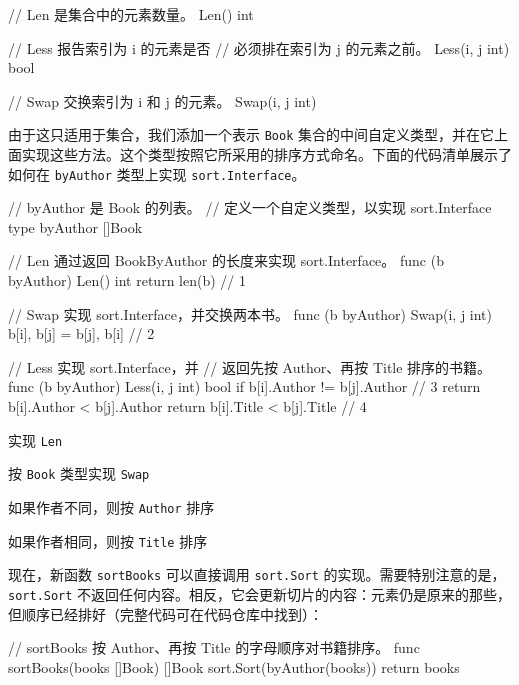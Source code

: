 \begin{gocode}[]
// Len 是集合中的元素数量。
Len() int

// Less 报告索引为 i 的元素是否
// 必须排在索引为 j 的元素之前。
Less(i, j int) bool

// Swap 交换索引为 i 和 j 的元素。
Swap(i, j int)
\end{gocode}

由于这只适用于集合，我们添加一个表示 \texttt{Book} 集合的中间自定义类型，并在它上面实现这些方法。这个类型按照它所采用的排序方式命名。下面的代码清单展示了如何在 \texttt{byAuthor} 类型上实现 \texttt{sort.Interface}。

\begin{gocode}[title={代码清单 3.22 在 \texttt{Books} 上实现 \texttt{sort.Interface}}]
// byAuthor 是 Book 的列表。
// 定义一个自定义类型，以实现 sort.Interface
type byAuthor []Book

// Len 通过返回 BookByAuthor 的长度来实现 sort.Interface。
func (b byAuthor) Len() int { return len(b) } // 1

// Swap 实现 sort.Interface，并交换两本书。
func (b byAuthor) Swap(i, j int) {
    b[i], b[j] = b[j], b[i] // 2
}

// Less 实现 sort.Interface，并
// 返回先按 Author、再按 Title 排序的书籍。
func (b byAuthor) Less(i, j int) bool {
    if b[i].Author != b[j].Author { // 3
        return b[i].Author < b[j].Author
    }
    return b[i].Title < b[j].Title // 4
}
\end{gocode}

\begin{codeannotations}
\item 实现 \texttt{Len}
\item 按 \texttt{Book} 类型实现 \texttt{Swap}
\item 如果作者不同，则按 \texttt{Author} 排序
\item 如果作者相同，则按 \texttt{Title} 排序
\end{codeannotations}

现在，新函数 \texttt{sortBooks} 可以直接调用 \texttt{sort.Sort} 的实现。需要特别注意的是，\texttt{sort.Sort} 不返回任何内容。相反，它会更新切片的内容：元素仍是原来的那些，但顺序已经排好（完整代码可在代码仓库中找到）：

\begin{gocode}[]
// sortBooks 按 Author、再按 Title 的字母顺序对书籍排序。
func sortBooks(books []Book) []Book {
    sort.Sort(byAuthor(books))
    return books
}
\end{gocode}

